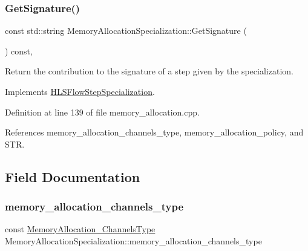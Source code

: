 \subsubsection{\texorpdfstring{Get\+Signature()}{GetSignature()}}
{\footnotesize\ttfamily const std\+::string Memory\+Allocation\+Specialization\+::\+Get\+Signature (\begin{DoxyParamCaption}{ }\end{DoxyParamCaption}) const\hspace{0.3cm}{\ttfamily [override]}, {\ttfamily [virtual]}}



Return the contribution to the signature of a step given by the specialization. 



Implements \hyperlink{classHLSFlowStepSpecialization_ae8c6ce8a3495c93e8a8edc01d8727023}{H\+L\+S\+Flow\+Step\+Specialization}.



Definition at line 139 of file memory\+\_\+allocation.\+cpp.



References memory\+\_\+allocation\+\_\+channels\+\_\+type, memory\+\_\+allocation\+\_\+policy, and S\+TR.



\subsection{Field Documentation}
\mbox{\label{classMemoryAllocationSpecialization_ac77451cff627c7426d5dc33b4c3879dc}} 
\subsubsection{\texorpdfstring{memory\+\_\+allocation\+\_\+channels\+\_\+type}{memory\_allocation\_channels\_type}}
{\footnotesize\ttfamily const \hyperlink{memory__allocation_8hpp_a84978b137ea64df6a0ffc0cc92cbdd3f}{Memory\+Allocation\+\_\+\+Channels\+Type} Memory\+Allocation\+Specialization\+::memory\+\_\+allocation\+\_\+channels\+\_\+type}



